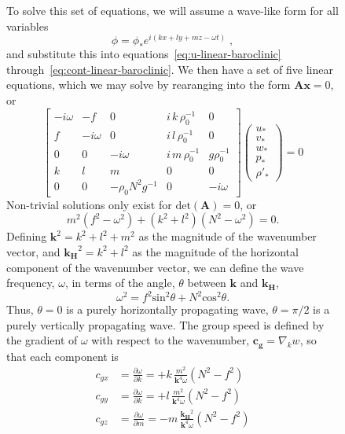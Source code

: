\documentclass[11pt]{report}
\numberwithin{equation}{section}
\begin{document}
\begin{figure}
To solve this set of equations, we will assume a wave-like form for all variables
\begin{equation}
    \phi = \phi_* e^{i(kx+ly+mz-\omega{}t)} \; ,
\end{equation}
and substitute this into equations~\ref{eq:u-linear-baroclinic} through~\ref{eq:cont-linear-baroclinic}.  We then have a set of five linear equations, which we may solve by rearanging into the form $\mathrm{\mathbf{A}} \mathbf{x} = 0$, or
\begin{equation}
    \left[
    \begin{array}{ccccc}
         -i \omega & -f & 0 & i \,k\, \rho_0^{-1} & 0 \\
         f & -i \omega & 0 & i \,l\, \rho_0^{-1} &  0 \\
         0 & 0 & -i \omega & i \,m\, \rho_0^{-1} & g \rho_0^{-1} \\
         k & l & m & 0 & 0 \\
         0 & 0 & -\rho_0 N^2 g^{-1} & 0 & -i \omega
    \end{array}
    \right]
    \left(
    \begin{array}{c}
        u_* \\ v_* \\ w_* \\ p_* \\ \rho'_*
    \end{array}
    \right) = 0
\end{equation}
Non-trivial solutions only exist for $\mathrm{det}(\mathrm{\mathbf{A}})=0$, or
\begin{equation}
    m^2 (f^2 - \omega^2) + (k^2 + l^2)(N^2-\omega^2) = 0.
\end{equation}
Defining $\mathbf{k}^2 = k^2 + l^2 + m^2$ as the magnitude of the wavenumber vector, and $\mathbf{k_H}^2 = k^2 + l^2$ as the magnitude of the horizontal component of the wavenumber vector, we can define the wave frequency, $\omega$, in terms of the angle, $\theta$ between $\mathbf{k}$ and $\mathbf{k_H}$,
\begin{equation}
    \omega^2 = f^2 \mathrm{sin}^2\theta + N^2 \mathrm{cos}^2\theta .
\end{equation}
Thus, $\theta = 0$ is a purely horizontally propagating wave, $\theta = \pi / 2$ is a purely vertically propagating wave.  The group speed is defined by the gradient of $\omega$ with respect to the wavenumber, $\mathbf{c_g} = \nabla_k w$, so that each component is
\begin{align}
    c_{gx} &= \frac{\partial \omega}{\partial k}
           = +k \,\frac{m^2}{\mathbf{k}^4 \omega}(N^2-f^2)\\
    c_{gy} &= \frac{\partial \omega}{\partial k}
           = +l \,\frac{m^2}{\mathbf{k}^4 \omega}(N^2-f^2)\\
    c_{gz} &= \frac{\partial \omega}{\partial m}
           = -m \,\frac{\mathbf{k_H}^2 }{\mathbf{k}^4 \omega}(N^2 - f^2)
\end{align}


\end{figure}
\end{document}

